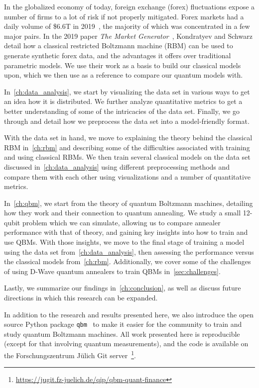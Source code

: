 In the globalized economy of today, foreign exchange (forex) fluctuations expose a number of firms to a lot of risk if not properly mitigated.
Forex markets had a daily volume of \$6.6T in 2019~\cite{bis_2019}, the majority of which was concentrated in a few major pairs.
In the 2019 paper \textit{The Market Generator}~\cite{kondratyev_2019}, Kondratyev and Schwarz detail how a classical restricted Boltzmann machine (RBM) can be used to generate synthetic forex data, and the advantages it offers over traditional parametric models.
We use their work as a basis to build our classical models upon, which we then use as a reference to compare our quantum models with.

In~\cref{ch:data_analysis}, we start by visualizing the data set in various ways to get an idea how it is distributed.
We further analyze quantitative metrics to get a better understanding of some of the intricacies of the data set.
Finally, we go through and detail how we preprocess the data set into a model-friendly format.

With the data set in hand, we move to explaining the theory behind the classical RBM in~\cref{ch:rbm} and describing some of the difficulties associated with training and using classical RBMs.
We then train several classical models on the data set discussed in~\cref{ch:data_analysis} using different preprocessing methods and compare them with each other using visualizations and a number of quantitative metrics.

In~\cref{ch:qbm}, we start from the theory of quantum Boltzmann machines, detailing how they work and their connection to quantum annealing.
We study a small 12-qubit problem which we can simulate, allowing us to compare annealer performance with that of theory, and gaining key insights into how to train and use QBMs.
With those insights, we move to the final stage of training a model using the data set from~\cref{ch:data_analysis}, then assessing the performance versus the classical models from~\cref{ch:rbm}.
Additionally, we cover some of the challenges of using D-Wave quantum annealers to train QBMs in~\cref{sec:challenges}.

Lastly, we summarize our findings in~\cref{ch:conclusion}, as well as discuss future directions in which this research can be expanded.

In addition to the research and results presented here, we also introduce the open source Python package \texttt{qbm}~\cite{qbm} to make it easier for the community to train and study quantum Boltzmann machines.
All work presented here is reproducible (except for that involving quantum measurements), and the code is available on the Forschungszentrum J\"ulich Git server~\footnote{\url{https://jugit.fz-juelich.de/qip/qbm-quant-finance}}.
